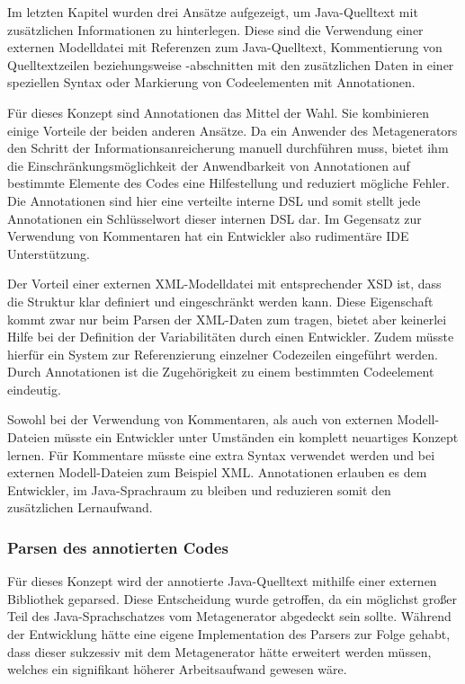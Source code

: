 \documentclass[12pt,oneside,a4paper,parskip]{scrbook}
\begin{document}
Im letzten Kapitel wurden drei Ansätze aufgezeigt, um Java-Quelltext mit zusätzlichen Informationen zu hinterlegen. Diese sind die Verwendung einer externen Modelldatei mit Referenzen zum Java-Quelltext, Kommentierung von Quelltextzeilen beziehungsweise -abschnitten mit den zusätzlichen Daten in einer speziellen Syntax oder Markierung von Codeelementen mit Annotationen.

Für dieses Konzept sind Annotationen das Mittel der Wahl. Sie kombinieren einige Vorteile der beiden anderen Ansätze. Da ein Anwender des Metagenerators den Schritt der Informationsanreicherung manuell durchführen muss, bietet ihm die Einschränkungsmöglichkeit der Anwendbarkeit von Annotationen auf bestimmte Elemente des Codes eine Hilfestellung und reduziert mögliche Fehler. Die Annotationen sind hier eine verteilte interne DSL und somit stellt jede Annotationen ein Schlüsselwort dieser internen DSL dar. Im Gegensatz zur Verwendung von Kommentaren hat ein Entwickler also rudimentäre IDE Unterstützung.

Der Vorteil einer externen XML-Modelldatei mit entsprechender XSD ist, dass die Struktur klar definiert und eingeschränkt werden kann. Diese Eigenschaft kommt zwar nur beim Parsen der XML-Daten zum tragen, bietet aber keinerlei Hilfe bei der Definition der Variabilitäten durch einen Entwickler. Zudem müsste hierfür ein System zur Referenzierung einzelner Codezeilen eingeführt werden. Durch Annotationen ist die Zugehörigkeit zu einem bestimmten Codeelement eindeutig.

Sowohl bei der Verwendung von Kommentaren, als auch von externen Modell-Dateien müsste ein Entwickler unter Umständen ein komplett neuartiges Konzept lernen. Für Kommentare müsste eine extra Syntax verwendet werden und bei externen Modell-Dateien zum Beispiel XML. Annotationen erlauben es dem Entwickler, im Java-Sprachraum zu bleiben und reduzieren somit den zusätzlichen Lernaufwand.

\subsubsection{Parsen des annotierten Codes}

Für dieses Konzept wird der annotierte Java-Quelltext mithilfe einer externen Bibliothek geparsed. Diese Entscheidung wurde getroffen, da ein möglichst großer Teil des Java-Sprachschatzes vom Metagenerator abgedeckt sein sollte. Während der Entwicklung hätte eine eigene Implementation des Parsers zur Folge gehabt, dass dieser sukzessiv mit dem Metagenerator hätte erweitert werden müssen, welches ein signifikant höherer Arbeitsaufwand gewesen wäre.
\end{document}
